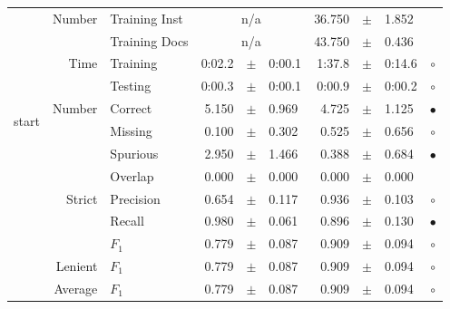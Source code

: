 \begin{longtable}{|r|r|l||rcl|rcl|c|}
\cline{2-10} & \multirow{2}{*}{    Number} &   Training Inst &    \multicolumn{3}{c|}{n/a}         &      36.750 &  $\pm$  &       1.852 &  \\
\cline{3-10} &                             &   Training Docs &    \multicolumn{3}{c|}{n/a}         &      43.750 &  $\pm$  &       0.436 &  \\
\cline{2-10} & \multirow{2}{*}{      Time} &        Training &      0:02.2 &  $\pm$  &      0:00.1 &      1:37.8 &  $\pm$  &      0:14.6 & $\circ$ \\
\cline{3-10} &                             &         Testing &      0:00.3 &  $\pm$  &      0:00.1 &      0:00.9 &  $\pm$  &      0:00.2 & $\circ$ \\
\hline
\hline
\multirow{11}{*}{\begin{sideways}start\end{sideways} }
             & \multirow{4}{*}{    Number} &         Correct &       5.150 &  $\pm$  &       0.969 &       4.725 &  $\pm$  &       1.125 & $\bullet$ \\
\cline{3-10} &                             &         Missing &       0.100 &  $\pm$  &       0.302 &       0.525 &  $\pm$  &       0.656 & $\circ$ \\
\cline{3-10} &                             &        Spurious &       2.950 &  $\pm$  &       1.466 &       0.388 &  $\pm$  &       0.684 & $\bullet$ \\
\cline{3-10} &                             &         Overlap &       0.000 &  $\pm$  &       0.000 &       0.000 &  $\pm$  &       0.000 &  \\
\cline{2-10} & \multirow{3}{*}{    Strict} &       Precision &       0.654 &  $\pm$  &       0.117 &       0.936 &  $\pm$  &       0.103 & $\circ$ \\
\cline{3-10} &                             &          Recall &       0.980 &  $\pm$  &       0.061 &       0.896 &  $\pm$  &       0.130 & $\bullet$ \\
\cline{3-10} &                             &           $F_1$ &       0.779 &  $\pm$  &       0.087 &       0.909 &  $\pm$  &       0.094 & $\circ$ \\
\cline{2-10} &                     Lenient &           $F_1$ &       0.779 &  $\pm$  &       0.087 &       0.909 &  $\pm$  &       0.094 & $\circ$ \\
\cline{2-10} &                     Average &           $F_1$ &       0.779 &  $\pm$  &       0.087 &       0.909 &  $\pm$  &       0.094 & $\circ$ \\

\end{longtable}
